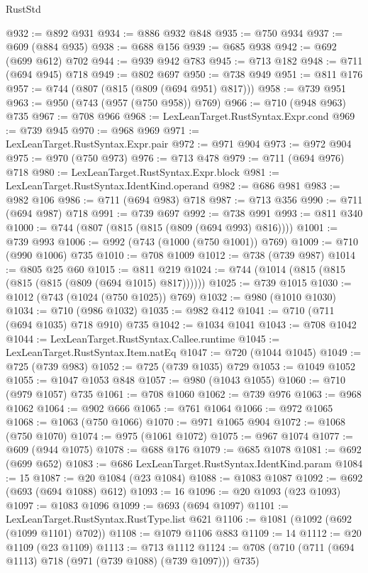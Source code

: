 \begin{lexlean}{RustStd}
\begin{coremodule}
@932 := @892 @931
@934 := @886 @932 @848
@935 := @750 @934
@937 := @609 (@884 @935)
@938 := @688 @156
@939 := @685 @938
@942 := @692 (@699 @612) @702
@944 := @939 @942 @783
@945 := @713 @182
@948 := @711 (@694 @945) @718
@949 := @802 @697
@950 := @738 @949
@951 := @811 @176
@957 := @744 (@807 (@815 (@809 (@694 @951) @817)))
@958 := @739 @951
@963 := @950 (@743 (@957 (@750 @958)) @769)
@966 := @710 (@948 @963) @735
@967 := @708 @966
@968 := LexLeanTarget.RustSyntax.Expr.cond
@969 := @739 @945
@970 := @968 @969
@971 := LexLeanTarget.RustSyntax.Expr.pair
@972 := @971 @904
@973 := @972 @904
@975 := @970 (@750 @973)
@976 := @713 @478
@979 := @711 (@694 @976) @718
@980 := LexLeanTarget.RustSyntax.Expr.block
@981 := LexLeanTarget.RustSyntax.IdentKind.operand
@982 := @686 @981
@983 := @982 @106
@986 := @711 (@694 @983) @718
@987 := @713 @356
@990 := @711 (@694 @987) @718
@991 := @739 @697
@992 := @738 @991
@993 := @811 @340
@1000 := @744 (@807 (@815 (@815 (@809 (@694 @993) @816))))
@1001 := @739 @993
@1006 := @992 (@743 (@1000 (@750 @1001)) @769)
@1009 := @710 (@990 @1006) @735
@1010 := @708 @1009
@1012 := @738 (@739 @987)
@1014 := @805 @25 @60
@1015 := @811 @219
@1024 := @744 (@1014 (@815 (@815 (@815 (@815 (@809 (@694 @1015) @817))))))
@1025 := @739 @1015
@1030 := @1012 (@743 (@1024 (@750 @1025)) @769)
@1032 := @980 (@1010 @1030)
@1034 := @710 (@986 @1032)
@1035 := @982 @412
@1041 := @710 (@711 (@694 @1035) @718 @910) @735
@1042 := @1034 @1041
@1043 := @708 @1042
@1044 := LexLeanTarget.RustSyntax.Callee.runtime
@1045 := LexLeanTarget.RustSyntax.Item.natEq
@1047 := @720 (@1044 @1045)
@1049 := @725 (@739 @983)
@1052 := @725 (@739 @1035) @729
@1053 := @1049 @1052
@1055 := @1047 @1053 @848
@1057 := @980 (@1043 @1055)
@1060 := @710 (@979 @1057) @735
@1061 := @708 @1060
@1062 := @739 @976
@1063 := @968 @1062
@1064 := @902 @666
@1065 := @761 @1064
@1066 := @972 @1065
@1068 := @1063 (@750 @1066)
@1070 := @971 @1065 @904
@1072 := @1068 (@750 @1070)
@1074 := @975 (@1061 @1072)
@1075 := @967 @1074
@1077 := @609 (@944 @1075)
@1078 := @688 @176
@1079 := @685 @1078
@1081 := @692 (@699 @652)
@1083 := @686 LexLeanTarget.RustSyntax.IdentKind.param
@1084 := 15
@1087 := @20 @1084 (@23 @1084)
@1088 := @1083 @1087
@1092 := @692 (@693 (@694 @1088) @612)
@1093 := 16
@1096 := @20 @1093 (@23 @1093)
@1097 := @1083 @1096
@1099 := @693 (@694 @1097)
@1101 := LexLeanTarget.RustSyntax.RustType.list @621
@1106 := @1081 (@1092 (@692 (@1099 @1101) @702))
@1108 := @1079 @1106 @883
@1109 := 14
@1112 := @20 @1109 (@23 @1109)
@1113 := @713 @1112
@1124 := @708 (@710 (@711 (@694 @1113) @718 (@971 (@739 @1088) (@739 @1097))) @735)

\end{coremodule}
\end{lexlean}
